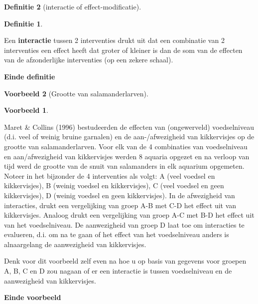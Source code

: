 \documentclass[
  12pt,dutch,coursenotes]{book}
\theoremstyle{definition}
\newtheorem{definition}{Definitie}[chapter]
\theoremstyle{definition}
\newtheorem{example}{Voorbeeld}[chapter]
\theoremstyle{definition}
\theoremstyle{remark}
\begin{document}
\begin{definition}[interactie of effect-modificatie]
\begin{definition}

\protect\hypertarget{def:unnamed-chunk-78}{}{\label{def:unnamed-chunk-78} \iffalse (interactie of effect-modificatie) \fi{} }

\end{definition}
\end{definition}

Een \textbf{interactie} tussen 2 interventies drukt uit dat een combinatie
van 2 interventies een effect heeft dat groter of kleiner is dan de som van
de effecten van de afzonderlijke interventies (op een zekere schaal).

\textbf{Einde definitie}

\begin{example}[Grootte van salamanderlarven]
\begin{example}

\protect\hypertarget{exm:unnamed-chunk-79}{}{\label{exm:unnamed-chunk-79} \iffalse (Grootte van salamanderlarven) \fi{} }

\end{example}
\end{example}

Maret \& Collins (1996) bestudeerden de effecten van (ongewerveld) voedselniveau (d.i. veel of weinig bruine garnalen) en de aan-/afwezigheid van kikkervisjes op de grootte van salamanderlarven. Voor elk van de 4 combinaties van voedselniveau en aan/afwezigheid van kikkervisjes werden 8 aquaria opgezet en na verloop van tijd werd de grootte van de snuit van salamanders in elk aquarium opgemeten. Noteer in het bijzonder de 4 interventies als volgt: A (veel voedsel en kikkervisjes), B (weinig voedsel en kikkervisjes), C (veel voedsel en geen kikkervisjes), D (weinig voedsel en geen kikkervisjes).
In de afwezigheid van interacties, drukt een vergelijking van groep A-B met C-D het effect uit
van kikkervisjes. Analoog drukt een vergelijking van groep A-C met B-D
het effect uit van het voedselniveau. De aanwezigheid van groep D laat toe om
interacties te evalueren, d.i. om na te gaan of het effect van het voedselniveau anders is alnaargelang de aanwezigheid van kikkervisjes.

Denk voor dit voorbeeld zelf even na hoe u op basis van gegevens voor
groepen A, B, C en D zou nagaan of er een interactie is tussen voedselniveau en
de aanwezigheid van kikkervisjes.

\textbf{Einde voorbeeld}
\end{document}
